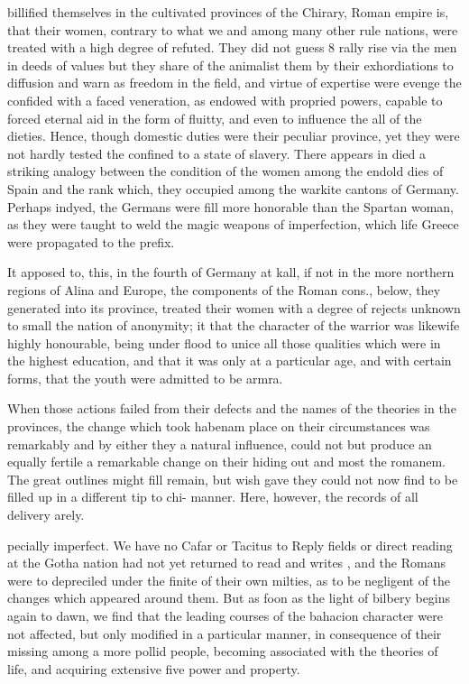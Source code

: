 \documentclass{article}
\begin{document}
billified themselves in the cultivated provinces of the Chirary, Roman empire is, that their women, contrary to what we and among many other rule nations, were treated with a high degree of refuted. They did not guess 8 rally rise via the men in deeds of values but they share of the animalist them by their exhordiations to diffusion and warn as freedom in the field, and virtue of expertise were evenge the confided with a faced veneration, as endowed with propried powers, capable to forced eternal aid in the form of fluitty, and even to influence the all of the dieties. Hence, though domestic duties were their peculiar province, yet they were not hardly tested the confined to a state of slavery. There appears in died a striking analogy between the condition of the women among the endold dies of Spain and the rank which, they occupied among the warkite cantons of Germany. Perhaps indyed, the Germans were fill more honorable than the Spartan woman, as they were taught to weld the magic weapons of imperfection, which life Greece were propagated to the prefix.

It apposed to, this, in the fourth of Germany at kall, if not in the more northern regions of Alina and Europe, the components of the Roman cons., below, they generated into its province, treated their women with a degree of rejects unknown to small the nation of anonymity; it that the character of the warrior was likewife highly honourable, being under flood to unice all those qualities which were in the highest education, and that it was only at a particular age, and with certain forms, that the youth were admitted to be armra.

When those actions failed from their defects and the names of the theories in the provinces, the change which took habenam place on their circumstances was remarkably and by either they a natural influence, could not but produce an equally fertile a remarkable change on their hiding out and most the romanem. The great outlines might fill remain, but wish gave they could not now find to be filled up in a different tip to chi- manner. Here, however, the records of all delivery arely.

pecially imperfect. We have no Cafar or Tacitus to Reply fields or direct reading at the Gotha nation had not yet returned to read and writes , and the Romans were to depreciled under the finite of their own milties, as to be negligent of the changes which appeared around them. But as foon as the light of bilbery begins again to dawn, we find that the leading courses of the bahacion character were not affected, but only modified in a particular manner, in consequence of their missing among a more pollid people, becoming associated with the theories of life, and acquiring extensive five power and property.
\end{document}
